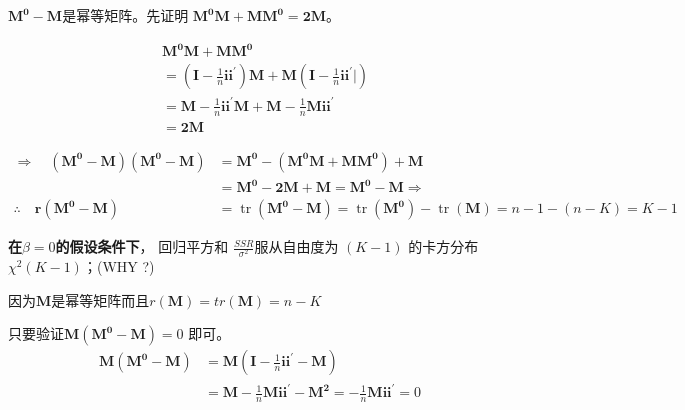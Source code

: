   \begin{myproof}[ a) ]
    $ \boldsymbol{M^{0} - M} $是幂等矩阵。先证明 $ \boldsymbol{M^{0}M+MM^{0} = 2M} $。

$$  \begin{aligned}
        & \boldsymbol{M^{0} M+M M^{0}}\\
        & = \left( \boldsymbol{I}-\frac{1}{n} \boldsymbol{i i^{\prime}} \right) \boldsymbol{M+M} 
        \left(\boldsymbol{I}-\frac{1}{n} \boldsymbol{i i^{\prime}} |\right)\\
        & = \boldsymbol{M}-\frac{1}{n} \boldsymbol{i i^{\prime}} \boldsymbol{M+M}-\frac{1}{n} \boldsymbol{M i i^{\prime}}\\
        & = \boldsymbol{2 M}
    \end{aligned}$$

$$ 
     \begin{aligned}
        \Longrightarrow  \quad  \left( \boldsymbol{ M^{0}-M} \right) \left(\boldsymbol{M^{0}-M}\right) 
        & = \boldsymbol{M^{0}-\left(M^{0} M+M M^{0}\right)+M} \\
        & = \boldsymbol{M^{0}-2 M+M=M^{0}-M \Longrightarrow} \\
        \therefore \quad \boldsymbol{r\left(M^{0}-M\right)} 
        & = \operatorname{tr}\left(\boldsymbol{M^{0}-M}\right)
        =\operatorname{tr}\left(\boldsymbol{M^{0}}\right)-\operatorname{tr}(\boldsymbol{M})=n-1-(n-K)=K-1
    \end{aligned}  $$

    { \bf 在$ \beta  =0 $的假设条件下}， 回归平方和 $ \frac{SSR}{\sigma^{2}} $服从自由度为 $ (K-1) $ 的卡方分布$ \chi^{2}(K-1) $；(WHY ?)

  \end{myproof}

  \begin{myproof}[ b) ]
    因为$ \boldsymbol{M} $是幂等矩阵而且$ r( \boldsymbol{M} ) = tr( \boldsymbol{M} ) = n − K $
  \end{myproof}

  \begin{myproof}[ c) ]
    只要验证$ \boldsymbol{M (M^{0} − M )} = 0$ 即可。
$$ \begin{aligned}
    \boldsymbol{M} \left( \boldsymbol{M^{0}-M} \right) & = \boldsymbol{M} \left( \boldsymbol{I}-\frac{1}{n} \boldsymbol{i i^{\prime}-M}\right) \\
    &=\boldsymbol{M}-\frac{1}{n} \boldsymbol{M i i^{\prime}-M^{2}}=-\frac{1}{n} \boldsymbol{M i i^{\prime}}=0
    \end{aligned} $$
  \end{myproof}

